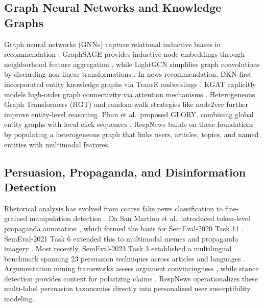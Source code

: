 \documentclass[conference]{IEEEtran}
\begin{document}
\subsection{Graph Neural Networks and Knowledge Graphs}
Graph neural networks (GNNs) capture relational inductive biases in recommendation \cite{kipf_gcn,velickovic_gat}. GraphSAGE provides inductive node embeddings through neighborhood feature aggregation \cite{hamilton_graphsage}, while LightGCN simplifies graph convolutions by discarding non-linear transformations \cite{he_lightgcn}. In news recommendation, DKN first incorporated entity knowledge graphs via TransE embeddings \cite{wang_dkn,bordes_transe}. KGAT explicitly models high-order graph connectivity via attention mechanisms \cite{wang_kgat}. Heterogeneous Graph Transformers (HGT) \cite{hu_hgt} and random-walk strategies like node2vec \cite{grover_node2vec} further improve entity-level reasoning. Phan et al.\ proposed GLORY, combining global entity graphs with local click sequences \cite{phan_glory}. RespNews builds on these foundations by populating a heterogeneous graph that links users, articles, topics, and named entities with multimodal features.

\subsection{Persuasion, Propaganda, and Disinformation Detection}
Rhetorical analysis has evolved from coarse fake news classification to fine-grained manipulation detection \cite{shu_fakenewsnet,zubiaga_rumour}. Da San Martino et al.\ introduced token-level propaganda annotation \cite{martino_propaganda}, which formed the basis for SemEval-2020 Task 11 \cite{martino_semeval2020}. SemEval-2021 Task 6 extended this to multimodal memes and propaganda imagery \cite{dimitrov_semeval2021}. Most recently, SemEval-2023 Task 3 established a multilingual benchmark spanning 23 persuasion techniques across articles and languages \cite{piskorski_semeval}. Argumentation mining frameworks assess argument convincingness \cite{habernal_argument}, while stance detection provides context for polarizing claims \cite{hardalov_survey}. RespNews operationalizes these multi-label persuasion taxonomies directly into personalized user susceptibility modeling.
\end{document}
